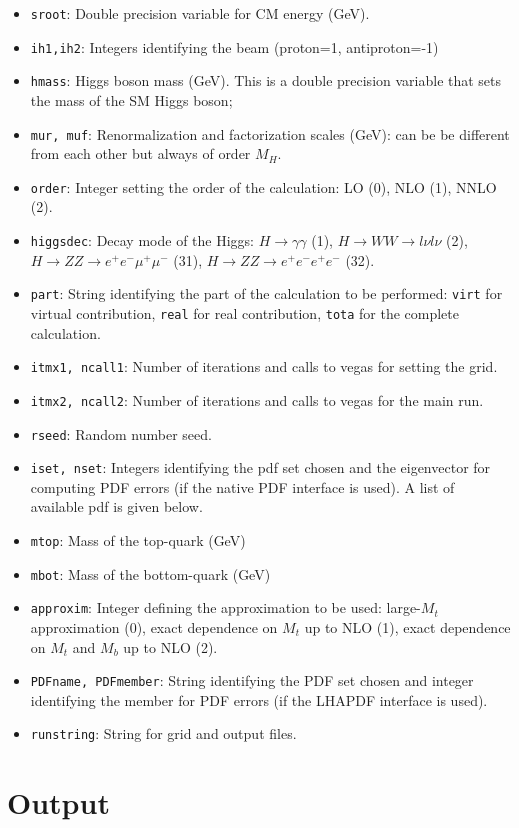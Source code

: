 \documentclass[12pt]{article}
\begin{document}
\begin{itemize}
\item {\tt sroot}: Double precision variable for CM energy (GeV).
\item {\tt ih1,ih2}: Integers identifying the beam (proton=1, antiproton=-1)
\item {\tt hmass}: Higgs boson mass (GeV). This is a double precision variable that sets
the mass of the SM Higgs boson;
\item {\tt mur, muf}: Renormalization and factorization scales (GeV): can be be different from each other but always of order $M_H$.
\item {\tt order}: Integer setting the order of the calculation: LO (0), NLO (1), NNLO (2).
\item {\tt higgsdec}: Decay mode of the Higgs: $H\to\gamma\gamma$ (1), $H\to WW\to l\nu l\nu$ (2), $H\to ZZ\to e^+e^-\mu^+\mu^-$ (31),
$H\to ZZ\to e^+e^-e^+e^-$ (32).
\item {\tt part}: String identifying the part of the calculation to be performed: {\tt virt} for virtual contribution, {\tt real} for real contribution, {\tt tota} for the complete calculation.
\item {\tt itmx1, ncall1}: Number of iterations and calls to vegas for setting the grid.
\item {\tt itmx2, ncall2}: Number of iterations and calls to vegas for the main run.
\item {\tt rseed}: Random number seed.
\item {\tt iset, nset}: Integers identifying the pdf set chosen and the eigenvector for computing PDF errors (if the native PDF interface is used).
A list of available pdf is given below.
\item {\tt mtop}: Mass of the top-quark (GeV)
\item {\tt mbot}: Mass of the bottom-quark (GeV)
\item {\tt approxim}: Integer defining the approximation to be used: large-$M_t$ approximation (0), exact dependence on $M_t$ up to NLO (1), exact dependence on $M_t$ and $M_b$ up to NLO (2).
\item {\tt PDFname, PDFmember}: String identifying the PDF set chosen and integer identifying the member for PDF 
errors (if the LHAPDF interface is used).
\item {\tt runstring}: String for grid and output files.
\end{itemize}



\section{Output}
\end{document}
